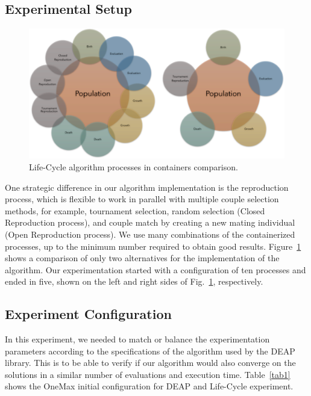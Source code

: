 \documentclass[runningheads]{llncs}
\begin{document}
\subsection{Experimental Setup}

\begin{figure}
    \includegraphics[width=\textwidth]{img/fig5_processes_containers.pdf}
    \caption{Life-Cycle algorithm processes in containers comparison.} \label{fig5}
    \end{figure}

One strategic difference in our algorithm implementation is the reproduction
process, which is flexible to work in parallel with multiple couple selection
methods, for example, tournament selection, random selection (Closed
Reproduction process), and couple match by creating a new mating individual
(Open Reproduction process). We use many combinations of the containerized
processes, up to the minimum number required to obtain good results.
Figure~\ref{fig5} shows a comparison of only two alternatives for the
implementation of the algorithm. Our experimentation started with a
configuration of ten processes and ended in five, shown on the left and right
sides of Fig.~\ref{fig5}, respectively.

\subsection{Experiment Configuration}

In this experiment, we needed to match or balance the experimentation
parameters according to the specifications of the algorithm used by the DEAP
library. This is to be able to verify if our algorithm would also converge on
the solutions in a similar number of evaluations and execution time.
Table~\ref{tab1} shows the OneMax initial configuration for DEAP and Life-Cycle
experiment.
\end{document}
